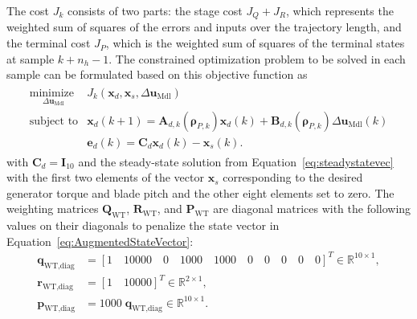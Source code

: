 The cost \( J_k \) consists of two parts: the stage cost $J_Q + J_R$, which represents the weighted sum of squares of the errors and inputs over the trajectory length, and the terminal cost $J_P$, which is the weighted sum of squares of the terminal states at sample $k+n_h-1$.
The constrained optimization problem to be solved in each sample can be formulated based on this objective function as
\begin{align} \label{eq:ObjFunWT}
    \begin{array}{ll}
        \underset{\Delta \bm{u}_{\text{Mdl}}}{\text{minimize }} & J_k(\bm{x}_d, \bm{x}_{s}, \Delta \bm{u}_{\text{Mdl}}) \\[10pt]
        \text{subject to} & \bm{x}_d(k+1) = \bm{A}_{d,k}(\bm{\rho}_{P,k}) \bm{x}_d(k) + \bm{B}_{d,k}(\bm{\rho}_{P,k}) \Delta \bm{u}_{\text{Mdl}}(k) \\[10pt]
        & \bm{e}_d(k) = \bm{C}_d \bm{x}_d(k) -\bm{x}_s(k).
    \end{array}
\end{align}
with $\bm{C}_d = \bm{I}_{10}$ and the steady-state solution from Equation~\eqref{eq:steadystatevec} with the first two elements of the vector $\bm{x}_s$ corresponding to the desired generator torque and blade pitch and the other eight elements set to zero.
The weighting matrices \( \bm{Q}_{\text{WT}} \), \( \bm{R}_{\text{WT}} \), and \( \bm{P}_{\text{WT}} \) are diagonal matrices with the following values on their diagonals to penalize the state vector in Equation~\eqref{eq:AugmentedStateVector}:
\begin{align}
    \bm{q}_{\text{WT,diag}} &= [1 \quad 10000 \quad 0 \quad 1000 \quad 1000 \quad 0 \quad 0 \quad 0 \quad 0 \quad 0]^T \in \mathbb{R}^{10 \times 1}, \\
    \bm{r}_{\text{WT,diag}} &= [1 \quad 10000]^T \in \mathbb{R}^{2 \times 1}, \\
    \bm{p}_{\text{WT,diag}} &= 1000 \; \bm{q}_{\text{WT,diag}} \in \mathbb{R}^{10 \times 1}.
\end{align}
